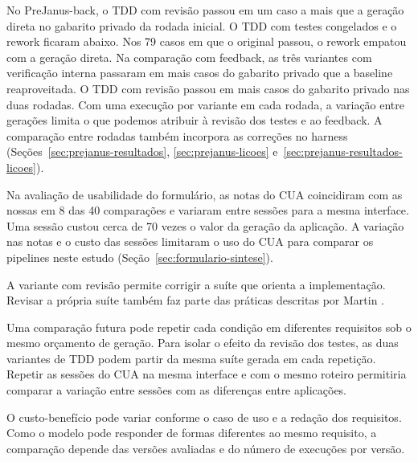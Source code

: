 \documentclass[a4paper,12pt,twoside,english,brazilian]{book}
\begin{document}
No PreJanus-back, o TDD com revisão passou em um caso a mais que a geração
direta no gabarito privado da rodada inicial. O TDD com testes congelados
e o rework ficaram abaixo. Nos 79 casos em que o original passou, o rework
empatou com a geração direta. Na comparação com feedback, as três variantes
com verificação interna passaram em mais casos do gabarito privado que a
baseline reaproveitada.
O TDD com revisão passou em mais casos do gabarito privado nas duas rodadas.
Com uma execução por variante em cada rodada, a variação entre gerações
limita o que podemos atribuir à revisão dos testes e ao feedback. A comparação
entre rodadas também incorpora as correções no harness
(Seções~\ref{sec:prejanus-resultados}, \ref{sec:prejanus-licoes}
e~\ref{sec:prejanus-resultados-licoes}).

Na avaliação de usabilidade do formulário, as notas do CUA
coincidiram com as nossas em 8 das 40 comparações e variaram entre sessões para a mesma interface.
Uma sessão custou cerca de 70 vezes o valor da geração da aplicação.
A variação nas notas e o custo das sessões limitaram o uso do CUA para
comparar os pipelines neste estudo (Seção~\ref{sec:formulario-sintese}).

A variante com revisão permite corrigir a suíte que orienta a implementação.
Revisar a própria suíte também faz parte das práticas descritas por Martin
\citep{thakker2026unclebob}.

Uma comparação futura pode repetir cada condição em diferentes requisitos
sob o mesmo orçamento de geração. Para isolar o efeito da revisão dos
testes, as duas variantes de TDD podem partir da mesma suíte gerada em
cada repetição. Repetir as sessões do CUA na mesma interface e com o mesmo
roteiro permitiria comparar a variação entre sessões com as diferenças
entre aplicações.

O custo-benefício pode variar conforme o caso de uso e a redação dos
requisitos. Como o modelo pode responder de formas diferentes ao mesmo
requisito, a comparação depende das versões avaliadas e do número de
execuções por versão.

\backmatter
\pagestyle{backmatter}
\printbibliography[title=\refname, heading=bibintoc]
\end{document}
